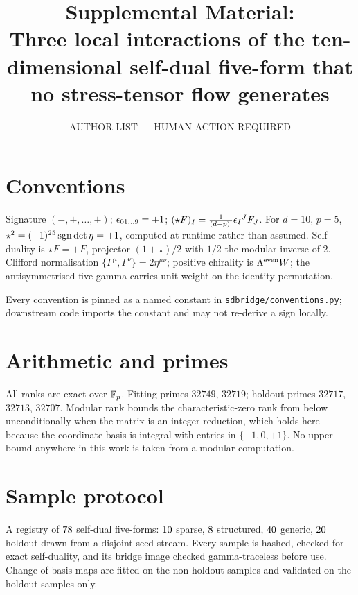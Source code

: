 \documentclass[aps,prl,onecolumn,superscriptaddress,nofootinbib]{revtex4-2}
\begin{document}
\title{Supplemental Material:\\
Three local interactions of the ten-dimensional self-dual five-form
that no stress-tensor flow generates}
\author{AUTHOR LIST --- HUMAN ACTION REQUIRED}
\maketitle

\noindent{}

\section{Conventions}
Signature $(-,+,\dots,+)$; $\epsilon_{01\ldots9}=+1$;
$(\star F)_I = \frac{1}{(d-p)!}\epsilon_I{}^J F_J$. For $d=10$, $p=5$,
$\star^2=(-1)^{25}\operatorname{sgn}\det\eta=+1$, computed at runtime rather than assumed.
Self-duality is $\star F=+F$, projector $(1+\star)/2$ with $1/2$ the modular
inverse of $2$. Clifford normalisation $\{\Gamma^\mu,\Gamma^\nu\}=2\eta^{\mu\nu}$;
positive chirality is $\Lambda^{\rm even}W$; the antisymmetrised five-gamma
carries unit weight on the identity permutation.

Every convention is pinned as a named constant in
\texttt{sdbridge/conventions.py}; downstream code imports the constant and may not
re-derive a sign locally.

\section{Arithmetic and primes}
All ranks are exact over $\mathbb{F}_p$. Fitting primes $32749$, $32719$; holdout primes
$32717$, $32713$, $32707$. Modular rank bounds the characteristic-zero rank from
below unconditionally when the matrix is an integer reduction, which holds here
because the coordinate basis is integral with entries in $\{-1,0,+1\}$.
No upper bound anywhere in this work is taken from a modular computation.

\section{Sample protocol}
A registry of $78$ self-dual five-forms: $10$ sparse,
$8$ structured, $40$ generic, $20$
holdout drawn from a disjoint seed stream. Every sample is hashed, checked for
exact self-duality, and its bridge image checked gamma-traceless before use.
Change-of-basis maps are fitted on the non-holdout samples and validated on the
holdout samples only.
\end{document}
